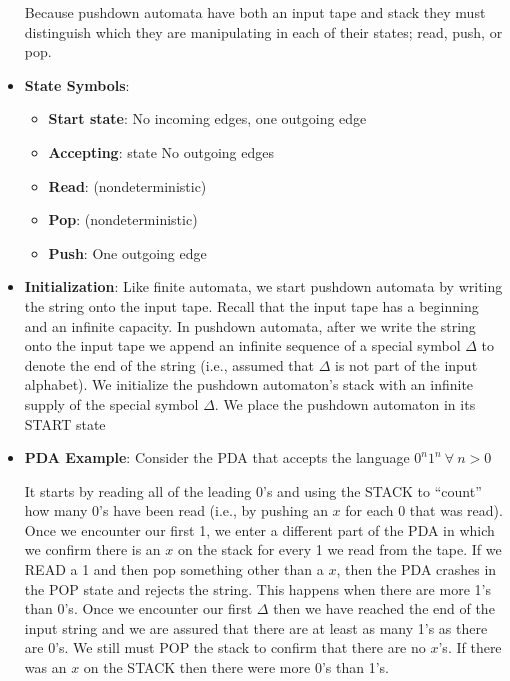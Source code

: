 \documentclass{report}
\begin{document}
\begin{itemize}
            \bigbreak \noindent 
            Because pushdown automata have both an input tape and stack they must distinguish which they are manipulating in each of their states; read, push, or pop.
            \pagebreak 
        \item \textbf{State Symbols}:
            \begin{itemize}
                \item \textbf{Start state}: No incoming edges, one outgoing edge
                \item \textbf{Accepting}: state No outgoing edges
                \item \textbf{Read}: (nondeterministic)
                \item \textbf{Pop}: (nondeterministic)
                \item \textbf{Push}: One outgoing edge
            \end{itemize}
            \bigbreak \noindent 
            \begin{figure}[ht]
                \centering
                \label{fig:pda1}
            \end{figure}
\item \textbf{Initialization}: Like finite automata, we start pushdown automata by writing the string onto the input tape. Recall that the input tape has a beginning and an infinite capacity.
    \bigbreak \noindent 
    In pushdown automata, after we write the string onto the input tape we append an infinite sequence of a special symbol $\Delta$ to denote the end of the string (i.e., assumed that $\Delta$ is not part of the input alphabet).
    \bigbreak \noindent 
    We initialize the pushdown automaton's stack with an infinite supply of the special symbol $\Delta$.
    \bigbreak \noindent 
    We place the pushdown automaton in its START state
    \pagebreak 
\item \textbf{PDA Example}: Consider the PDA that accepts the language $0^{n}1^{n} \ \forall \ n >0 $
    \bigbreak \noindent 
    \begin{figure}[ht]
        \centering
        \label{fig:pda2}
    \end{figure}
    \bigbreak \noindent 
    It starts by reading all of the leading 0's and using the STACK to ``count'' how many 0's have been read (i.e., by pushing an $x$ for each 0 that was read).
    \bigbreak \noindent 
    Once we encounter our first 1, we enter a different part of the PDA in which we confirm there is an $x$ on the stack for every 1 we read from the tape.
    \bigbreak \noindent 
    If we READ a 1 and then pop something other than a $x$, then the PDA crashes in the POP state and rejects the string. This happens when there are more 1's than 0's.
    \bigbreak \noindent 
    Once we encounter our first $\Delta$ then we have reached the end of the input string and we are assured that there are at least as many 1's as there are 0's.
    \bigbreak \noindent 
    We still must POP the stack to confirm that there are no $x$'s. If there was an $x$ on the STACK then there were more 0's than 1's.

    \end{itemize}
\end{document}
